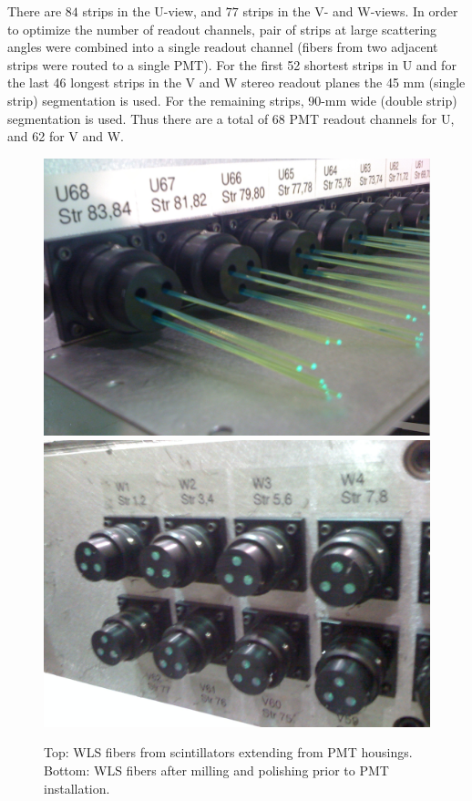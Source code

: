 There are $84$ strips in the U-view, and $77$ strips in the V- and W-views. In order to optimize the number of readout channels, pair of strips at large scattering angles were combined into a single readout channel (fibers from two adjacent strips were routed to a single PMT).  For the first 52 shortest strips in U and for the last 46 longest strips in the V and W stereo readout planes the 45 mm (single strip) segmentation is used. For the
remaining strips, 90-mm wide (double strip) segmentation is used.  Thus there are a total of 68 PMT readout channels for U, and 62 for V and W.
\begin{figure}[hbt]
\centering
\includegraphics[width=0.9\columnwidth,keepaspectratio]{img/S3_5a.png}
\includegraphics[width=0.9\columnwidth,keepaspectratio]{img/S3_5b.png}
\caption[PCAL UVW Layers]{Top: WLS fibers from scintillators extending from PMT housings. Bottom: WLS fibers after milling and polishing prior to PMT installation.}
\label{fig:S3_5}
\end{figure}

